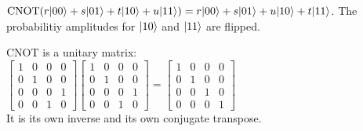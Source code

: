 \begin{example}
    $\mathrm{CNOT}(r\lvert00\rangle + s\lvert01\rangle + t\lvert10\rangle + u\lvert11\rangle) = r\lvert00\rangle + s\lvert01\rangle + u\lvert10\rangle + t\lvert11\rangle$. The probabilitiy amplitudes for $\lvert10\rangle$ and $\lvert11\rangle$ are flipped.
\end{example}

\pagebreak

\begin{explanation}
    CNOT is a unitary matrix:\\
    $\begin{bmatrix}
        1 & 0 & 0 & 0\\
        0 & 1 & 0 & 0\\
        0 & 0 & 0 & 1\\
        0 & 0 & 1 & 0
    \end{bmatrix} \begin{bmatrix}
        1 & 0 & 0 & 0\\
        0 & 1 & 0 & 0\\
        0 & 0 & 0 & 1\\
        0 & 0 & 1 & 0
    \end{bmatrix} = \begin{bmatrix}
        1 & 0 & 0 & 0\\
        0 & 1 & 0 & 0\\
        0 & 0 & 1 & 0\\
        0 & 0 & 0 & 1
    \end{bmatrix}$\\
    It is its own inverse and its own conjugate transpose.
\end{explanation}

